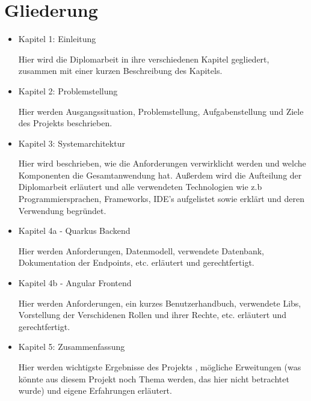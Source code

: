 \section{Gliederung}

\begin{itemize}
    \item  Kapitel 1: Einleitung
    
    Hier wird die Diplomarbeit in ihre verschiedenen Kapitel gegliedert, zusammen mit einer kurzen Beschreibung des Kapitels.
    
    \item  Kapitel 2: Problemstellung
    
    Hier werden Ausgangssituation, Problemstellung, Aufgabenstellung und Ziele des Projekts beschrieben.
    
    \item  Kapitel 3: Systemarchitektur
    
    Hier wird beschrieben, wie die Anforderungen verwirklicht werden und welche Komponenten die Gesamtanwendung hat. 
    Außerdem wird die Aufteilung der Diplomarbeit erläutert und alle verwendeten Technologien 
    wie z.b Programmiersprachen, Frameworks, IDE's aufgelistet sowie erklärt und deren Verwendung begründet.
    
    \item  Kapitel 4a - Quarkus Backend
    
    Hier werden Anforderungen, Datenmodell, verwendete Datenbank, Dokumentation der Endpoints, etc. erläutert und gerechtfertigt.
    
    \item  Kapitel 4b - Angular Frontend
    
    Hier werden Anforderungen, ein kurzes Benutzerhandbuch, verwendete Libs, Vorstellung der Verschidenen Rollen und ihrer Rechte, etc. erläutert und gerechtfertigt.
    
    \item  Kapitel 5: Zusammenfassung
    
    Hier werden wichtigste Ergebnisse des Projekts , mögliche Erweitungen (was könnte aus diesem Projekt noch Thema werden, 
    das hier nicht betrachtet wurde) und eigene Erfahrungen erläutert.
\end{itemize}